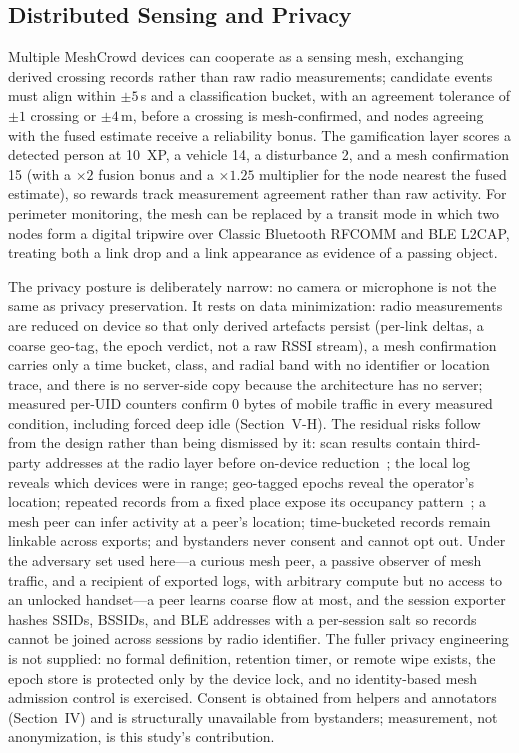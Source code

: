 \documentclass[journal,10pt]{IEEEtran}
\begin{document}
\subsection{Distributed Sensing and Privacy}
\label{sec:meshdesign}
Multiple MeshCrowd devices can cooperate as a sensing mesh, exchanging
derived crossing records rather than raw radio measurements; candidate events
must align within $\pm5$\,s and a classification bucket, with an agreement
tolerance of $\pm1$ crossing or $\pm4$\,m, before a crossing is
mesh-confirmed, and nodes agreeing with the fused estimate receive a
reliability bonus. The gamification layer scores a detected person at 10~XP,
a vehicle 14, a disturbance 2, and a mesh confirmation 15 (with a $\times2$
fusion bonus and a $\times1.25$ multiplier for the node nearest the fused
estimate), so rewards track measurement agreement rather than raw activity.
For perimeter monitoring, the mesh can be replaced by a transit mode in which
two nodes form a digital tripwire over Classic Bluetooth RFCOMM and BLE
L2CAP, treating both a link drop and a link appearance as evidence of a
passing object.

The privacy posture is deliberately narrow: no camera or microphone is not
the same as privacy preservation. It rests on data minimization: radio
measurements are reduced on device so that only derived artefacts persist
(per-link deltas, a coarse geo-tag, the epoch verdict, not a raw RSSI stream),
a mesh confirmation carries only a time bucket, class, and radial band with no
identifier or location trace, and there is no server-side copy because the
architecture has no server; measured per-UID counters confirm $0$ bytes of
mobile traffic in every measured condition, including forced deep idle
(Section~V-H). The residual risks follow from the design rather than being
dismissed by it: scan results contain third-party addresses at the radio layer
before on-device reduction~\cite{casar2022,ryan2013woot}; the local log reveals
which devices were in range; geo-tagged epochs reveal the operator's location;
repeated records from a fixed place expose its occupancy
pattern~\cite{beresford2003}; a mesh peer can infer activity at a peer's
location; time-bucketed records remain linkable across exports; and bystanders
never consent and cannot opt out. Under the adversary set used here---a curious
mesh peer, a passive observer of mesh traffic, and a recipient of exported
logs, with arbitrary compute but no access to an unlocked handset---a peer
learns coarse flow at most, and the session exporter hashes SSIDs, BSSIDs, and
BLE addresses with a per-session salt so records cannot be joined across
sessions by radio identifier. The fuller privacy engineering is not supplied:
no formal definition, retention timer, or remote wipe exists, the epoch store
is protected only by the device lock, and no identity-based mesh admission
control is exercised. Consent is obtained from helpers and annotators
(Section~IV) and is structurally unavailable from bystanders; measurement, not
anonymization, is this study's contribution.
\end{document}
